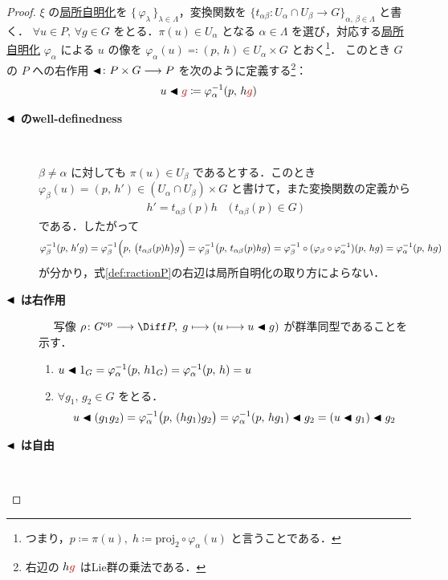\documentclass[geometry_main]{subfiles}
\begin{document}
\begin{proof}
    $\xi$ の\hyperref[def.fiber-1]{局所自明化}を $\{\, \varphi_\lambda \,\}_{\lambda \in \Lambda}$，変換関数を $\{t_{\alpha\beta} \colon U_\alpha \cap U_\beta \to G\}_{\alpha,\, \beta \in \Lambda}$ と書く．
	$\forall u \in P,\, \forall g \in G$ をとる．$\pi(u) \in U_\alpha$ となる $\alpha \in \Lambda$ を選び，対応する\hyperref[def.fiber-1]{局所自明化} $\varphi_\alpha$ による $u$ の像を $\varphi_\alpha (u) \eqqcolon (p,\, h) \in U_\alpha \times G$ とおく\footnote{つまり，$p \coloneqq \pi(u),\; h \coloneqq \mathrm{proj}_2 \circ \varphi_\alpha (u)$ と言うことである．}．
    このとき $G$ の $P$ への右作用 $\blacktriangleleft \colon P \times G \longrightarrow P$ を次のように定義する\footnote{右辺の $h \textcolor{red}{g}$ はLie群の乗法である．}：
	\begin{align}
		\label{def:ractionP}
		u \blacktriangleleft \textcolor{red}{g} \coloneqq \varphi_\alpha^{-1}(p,\, h \textcolor{red}{g})
	\end{align}
	
	\begin{description}
		\item[\textbf{$\blacktriangleleft$ のwell-definedness}]　

			$\beta \neq \alpha$ に対しても $\pi(u) \in U_\beta$ であるとする．このとき $\varphi_\beta(u) = (p,\, h') \in (U_\alpha \cap U_\beta) \times G$ と書けて，また変換関数の定義から
			\begin{align}
				h' = t_{\alpha\beta}(p) h \quad \bigl(\, t_{\alpha\beta}(p) \in G\, \bigr)
			\end{align}
			である．したがって
			\begin{align}
				\varphi_\beta^{-1}(p,\, h'g) = \varphi_\beta^{-1}\Bigl(p,\, \bigl(t_{\alpha\beta}(p) h\bigr)g\Bigr) = \varphi_\beta^{-1}\bigl(p,\, t_{\alpha\beta}(p)  hg \bigr) = \varphi_\beta^{-1} \circ (\varphi_\beta \circ \varphi_\alpha^{-1})(p,\, h g) = \varphi_\alpha^{-1}(p,\, h g)
			\end{align}
			が分かり，式\eqref{def:ractionP}の右辺は局所自明化の取り方によらない．
		\item[\textbf{$\blacktriangleleft$ は右作用}]　
			写像 $\rho \colon G^{\text{op}} \lto \Diff P,\; g \lmto (u \lmto u \btl g)$ が群準同型であることを示す．
            \begin{enumerate}
				\item $u \blacktriangleleft 1_G = \varphi_\alpha^{-1}(p,\, h1_G) = \varphi_\alpha^{-1}(p,\, h) = u$
				\item $\forall g_1,\, g_2 \in G$ をとる．
				\begin{align}
					u \blacktriangleleft (g_1g_2) = \varphi_\alpha^{-1}\bigl(p,\, (hg_1)g_2 \bigr) = \varphi_\alpha^{-1}(p,\, hg_1) \blacktriangleleft g_2 = (u \blacktriangleleft g_1) \blacktriangleleft g_2
				\end{align} 
			\end{enumerate}
		\item[\textbf{$\blacktriangleleft$ は自由}]　
		

\end{description}
\end{proof}
\end{document}
